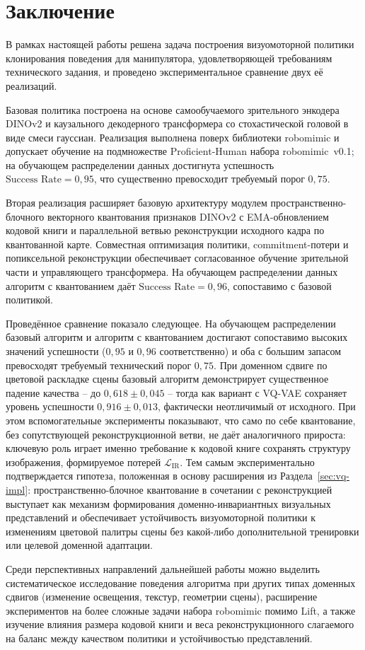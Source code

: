 \chapter*{Заключение}
\label{ch:conclusion}

В рамках настоящей работы решена задача построения визуомоторной политики клонирования поведения для манипулятора, удовлетворяющей требованиям технического задания, и проведено экспериментальное сравнение двух её реализаций.

Базовая политика построена на основе самообучаемого зрительного энкодера DINOv2 и каузального декодерного трансформера со стохастической головой в виде смеси гауссиан. Реализация выполнена поверх библиотеки robomimic и допускает обучение на подмножестве Proficient-Human набора robomimic~v0.1; на обучающем распределении данных достигнута успешность $\text{Success Rate} = 0{,}95$, что существенно превосходит требуемый порог $0{,}75$.

Вторая реализация расширяет базовую архитектуру модулем пространственно-блочного векторного квантования признаков DINOv2 с EMA-обновлением кодовой книги и параллельной ветвью реконструкции исходного кадра по квантованной карте. Совместная оптимизация политики, commitment-потери и попиксельной реконструкции обеспечивает согласованное обучение зрительной части и управляющего трансформера. На обучающем распределении данных алгоритм с квантованием даёт $\text{Success Rate} = 0{,}96$, сопоставимо с базовой политикой.

Проведённое сравнение показало следующее. На обучающем распределении базовый алгоритм и алгоритм с квантованием достигают сопоставимо высоких значений успешности ($0{,}95$ и $0{,}96$ соответственно) и оба с большим запасом превосходят требуемый технический порог $0{,}75$. При доменном сдвиге по цветовой раскладке сцены базовый алгоритм демонстрирует существенное падение качества -- до $0{,}618 \pm 0{,}045$ -- тогда как вариант с VQ-VAE сохраняет уровень успешности $0{,}916 \pm 0{,}013$, фактически неотличимый от исходного. При этом вспомогательные эксперименты показывают, что само по себе квантование, без сопутствующей реконструкционной ветви, не даёт аналогичного прироста: ключевую роль играет именно требование к кодовой книге сохранять структуру изображения, формируемое потерей $\mathcal{L}_{\text{IR}}$. Тем самым экспериментально подтверждается гипотеза, положенная в основу расширения из Раздела~\ref{sec:vq-impl}: пространственно-блочное квантование в сочетании с реконструкцией выступает как механизм формирования доменно-инвариантных визуальных представлений и обеспечивает устойчивость визуомоторной политики к изменениям цветовой палитры сцены без какой-либо дополнительной тренировки или целевой доменной адаптации.

Среди перспективных направлений дальнейшей работы можно выделить систематическое исследование поведения алгоритма при других типах доменных сдвигов (изменение освещения, текстур, геометрии сцены), расширение экспериментов на более сложные задачи набора robomimic помимо Lift, а также изучение влияния размера кодовой книги и веса реконструкционного слагаемого на баланс между качеством политики и устойчивостью представлений.

\endinput
